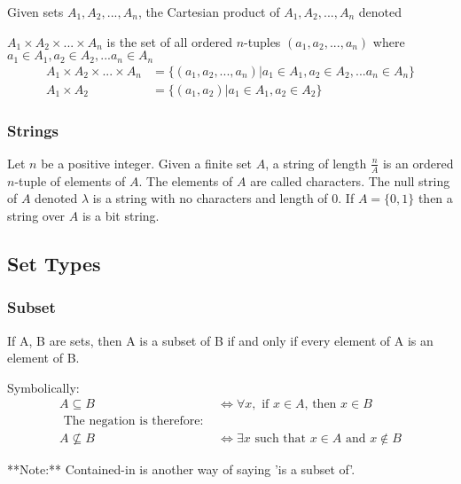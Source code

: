 \documentclass[11pt]{article}
\begin{document}
\begin{definition}\label{def:cartesian-product}
    Given sets $A_1, A_2, ..., A_n$, the Cartesian product of $A_1, A_2, ..., A_n$
    denoted

    $A_1 \times A_2 \times ... \times A_n$ is the set of all ordered $n$-tuples
    $(a_1, a_2, ..., a_n)$ where $a_1 \in A_1, a_2 \in A_2, ... a_n \in A_n$
    \begin{equation}
        \begin{aligned}
            A_1 \times A_2 \times ... \times A_n &= \{ (a_1, a_2, ..., a_n) | a_1 \in A_1, a_2 \in A_2, ... a_n \in A_n \} \\
            A_1 \times A_2 &= \{ (a_1, a_2) | a_1 \in A_1, a_2 \in A_2 \}
        \end{aligned}
    \end{equation}
\end{definition}

\subsubsection{Strings}
\begin{definition}[Strings]\label{def:string}
    Let $n$ be a positive integer. Given a finite set $A$, a string
    of length $\frac{n}{A}$ is an ordered $n$-tuple of elements of $A$.
    The elements of $A$ are called characters. The null string of $A$
    denoted $\lambda$ is a string with no characters and length of $0$.
    If $A = \{0, 1\}$ then a string over $A$ is a bit string.
\end{definition}

\subsection{Set Types}

\subsubsection{Subset}

\begin{definition}[Subset]\label{def:subset}
    If A, B are sets, then A is a subset of B if and only if every element of A is an element of B.

    Symbolically:
    \begin{align*}
        A \subseteq B &\iff \forall x, \text{ if $x \in A$, then $x \in B$} \\
        \text{ The negation is therefore: } & \\
        A \not \subseteq B &\iff \exists x \text{ such that $x \in A$ and $x \notin B$}
    \end{align*}

    \starON
    **Note:** Contained-in is another way of saying 'is a subset of'.
    \starOFF
\end{definition}
\end{document}
